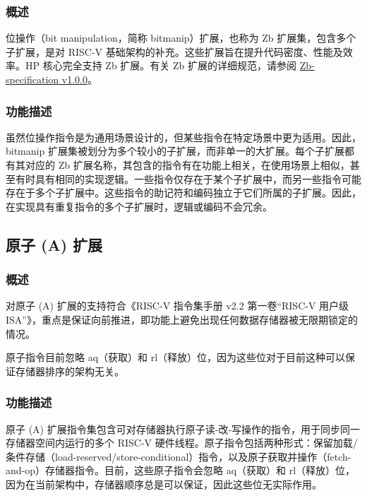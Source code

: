 \documentclass[main\_\_CN.tex]{subfiles}
\begin{document}
\subsubsection{概述}
\label{sec:riscvcpu-zb-overview}

位操作（bit manipulation，简称 bitmanip）扩展，也称为 Zb 扩展集，包含多个子扩展，是对 RISC-V 基础架构的补充。这些扩展旨在提升代码密度、性能及效率。HP 核心完全支持 Zb 扩展。有关 Zb 扩展的详细规范，请参阅 \href{https://github.com/riscv/riscv-b}{Zb-specification v1.0.0}。


\subsubsection{功能描述}
\label{sec:riscvcpu-zb-func-descr}

虽然位操作指令是为通用场景设计的，但某些指令在特定场景中更为适用。因此，bitmanip 扩展集被划分为多个较小的子扩展，而非单一的大扩展。每个子扩展都有其对应的 Zb 扩展名称，其包含的指令有在功能上相关，在使用场景上相似，甚至有时具有相同的实现逻辑。一些指令仅存在于某个子扩展中，而另一些指令可能存在于多个子扩展中。这些指令的助记符和编码独立于它们所属的子扩展。因此，在实现具有重复指令的多个子扩展时，逻辑或编码不会冗余。

\newpage


\newpage
\subsection{原子 (A) 扩展}
\label{sec:riscvcpu-atomic}

\subsubsection{概述}
\label{sec:riscvcpu-atomic-overview}

对原子 (A) 扩展的支持符合《RISC-V 指令集手册 v2.2 第一卷“RISC-V 用户级 ISA”》，重点是保证向前推进，即功能上避免出现任何数据存储器被无限期锁定的情况。

原子指令目前忽略 aq（获取）和 rl（释放）位，因为这些位对于目前这种可以保证存储器排序的架构无关。

\subsubsection{功能描述}
\label{sec:riscvcpu-atomic-func-descr}

原子 (A) 扩展指令集包含可对存储器执行原子读-改-写操作的指令，用于同步同一存储器空间内运行的多个 RISC-V 硬件线程。原子指令包括两种形式：保留加载/条件存储（load-reserved/store-conditional）指令，以及原子获取并操作（fetch-and-op）存储器指令。目前，这些原子指令会忽略 aq（获取）和 rl（释放）位，因为在当前架构中，存储器顺序总是可以保证，因此这些位无实际作用。
\end{document}
